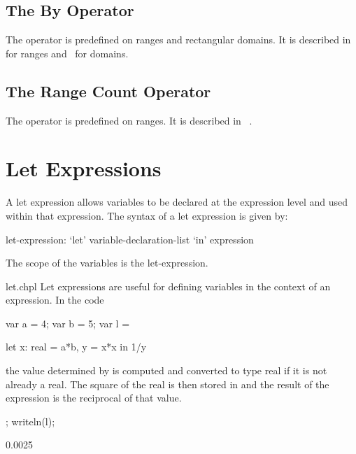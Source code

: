 \subsection{The By Operator}
\label{The_By_Operator}

The operator  is predefined on ranges and rectangular domains.
It is described in~ for ranges
and~ for domains.

\subsection{The Range Count Operator}
\label{The_Range_Count_Operator}

The operator \chpl{#} is predefined on ranges. It is described
in ~.

\section{Let Expressions}
\label{Let_Expressions}

A let expression allows variables to be declared at the expression
level and used within that expression.  The syntax of a let expression
is given by:
\begin{syntax}
let-expression:
  `let' variable-declaration-list `in' expression
\end{syntax}
The scope of the variables is the let-expression.
\begin{chapelexample}{let.chpl}
Let expressions are useful for defining variables in the context of
an expression.  In the code
\begin{chapelnoprint}
  var a = 4;
  var b = 5;
  var l =
\end{chapelnoprint}
\begin{chapel}
  let x: real = a*b, y = x*x in 1/y
\end{chapel}
the value determined by  is computed and converted to type
real if it is not already a real.  The square of the real is then
stored in  and the result of the expression is the reciprocal
of that value.
\begin{chapelnoprint}
  ;
  writeln(l);
\end{chapelnoprint}
\begin{chapeloutput}
0.0025
\end{chapeloutput}
\end{chapelexample}

